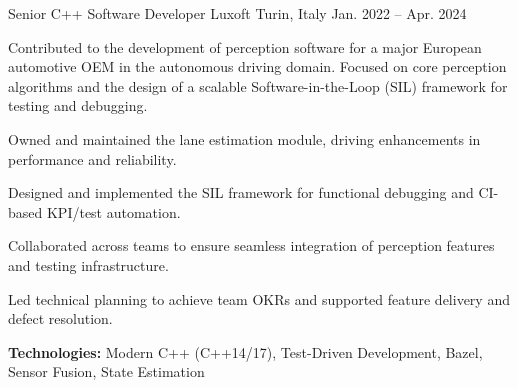 
\begin{cventries}

  \cventry
  {Senior C++ Software Developer} %
  {Luxoft} %
  {Turin, Italy} %
  {Jan. 2022 -- Apr. 2024} %
  {
    \begin{cvparagraph}
      Contributed to the development of perception software for a major European automotive OEM in the autonomous driving domain. Focused on core perception algorithms and the design of a scalable Software-in-the-Loop (SIL) framework for testing and debugging.
    \end{cvparagraph}
    \vspace{1em}
    \begin{cvitems}
    \item {Owned and maintained the lane estimation module, driving enhancements in performance and reliability.}
    \item {Designed and implemented the SIL framework for functional debugging and CI-based KPI/test automation.}
    \item {Collaborated across teams to ensure seamless integration of perception features and testing infrastructure.}
    \item {Led technical planning to achieve team OKRs and supported feature delivery and defect resolution.}
    \item {\textbf{Technologies:} Modern C++ (C++14/17), Test-Driven Development, Bazel, Sensor Fusion, State Estimation}
    \end{cvitems}
  }



\end{cventries}
